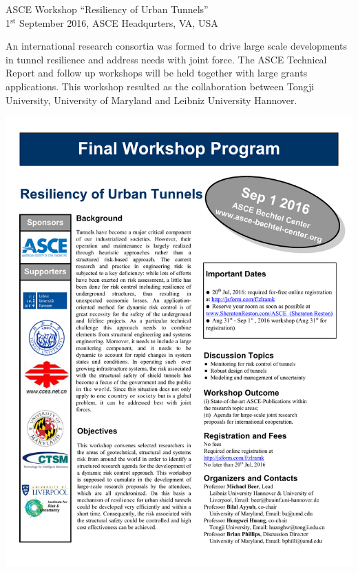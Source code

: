 \documentclass[11pt]{article}%
\begin{document}




\cleardoublepage

\thispagestyle{Symposia}
\begin{minipage}{1.\textwidth}
\vspace{20pt}
{\LARGE {ASCE Workshop ``Resiliency of Urban Tunnels''}}\\
{\large 1$^{\text{st}}$ September 2016, ASCE Headqurters, VA, USA}

An international research consortia was formed to drive large scale developments in tunnel resilience and address needs with joint force. The ASCE Technical Report and follow up workshops will be held together with large grants applications. This workshop resulted as the collaboration between Tongji University, University of Maryland and Leibniz University Hannover.

\includegraphics[width=1\linewidth]{training/asceWorkshopFlyer.pdf}


\end{minipage}
\end{document}
